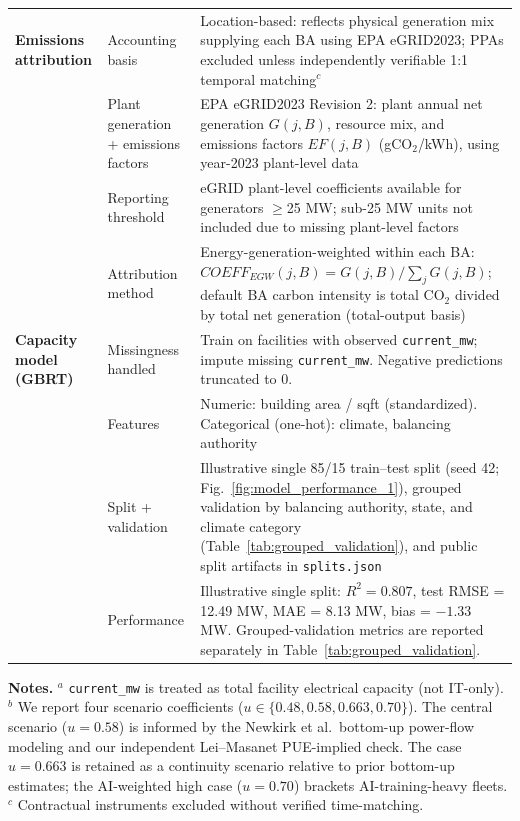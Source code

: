 \documentclass[12pt]{article}
\begin{document}
\begin{table}
\begin{tabular}{p{3.2cm} p{4.2cm} p{14.2cm}}
\midrule
\textbf{Emissions attribution} &
Accounting basis &
Location-based: reflects physical generation mix supplying each BA using EPA eGRID2023; PPAs excluded unless independently verifiable 1:1 temporal matching$^{c}$ \\

&
Plant generation + emissions factors &
EPA eGRID2023 Revision 2: plant annual net generation $G(j,B)$, resource mix, and emissions factors $EF(j,B)$ (gCO$_2$/kWh), using year-2023 plant-level data \\

&
Reporting threshold &
eGRID plant-level coefficients available for generators $\ge$25 MW; sub-25 MW units not included due to missing plant-level factors \\

&
Attribution method &
Energy-generation-weighted within each BA: $COEFF_{EGW}(j,B)=G(j,B)/\sum_{j}G(j,B)$; default BA carbon intensity is total CO$_2$ divided by total net generation (total-output basis) \\

\midrule
\textbf{Capacity model (GBRT)} &
Missingness handled &
Train on facilities with observed \texttt{current\_mw}; impute missing \texttt{current\_mw}. Negative predictions truncated to 0. \\

&
Features &
Numeric: building area / sqft (standardized). Categorical (one-hot): climate, balancing authority \\

&
Split + validation &
Illustrative single 85/15 train--test split (seed 42; Fig.~\ref{fig:model_performance_1}), grouped validation by balancing authority, state, and climate category (Table~\ref{tab:grouped_validation}), and public split artifacts in \texttt{splits.json} \\

&
Performance &
Illustrative single split: $R^2=0.807$, test RMSE = 12.49 MW, MAE = 8.13 MW, bias = $-1.33$ MW. Grouped-validation metrics are reported separately in Table~\ref{tab:grouped_validation}. \\

\bottomrule
\end{tabular}

\vspace{0.15cm}
\raggedright
\scriptsize
\textbf{Notes.}
$^{a}$ \texttt{current\_mw} is treated as total facility electrical capacity (not IT-only).
$^{b}$ We report four scenario coefficients ($u \in \{0.48, 0.58, 0.663, 0.70\}$). The central scenario ($u=0.58$) is informed by the Newkirk et al.\ bottom-up power-flow modeling and our independent Lei--Masanet PUE-implied check. The case $u=0.663$ is retained as a continuity scenario relative to prior bottom-up estimates; the AI-weighted high case ($u=0.70$) brackets AI-training-heavy fleets.
$^{c}$ Contractual instruments excluded without verified time-matching.

\end{table}
\end{document}
